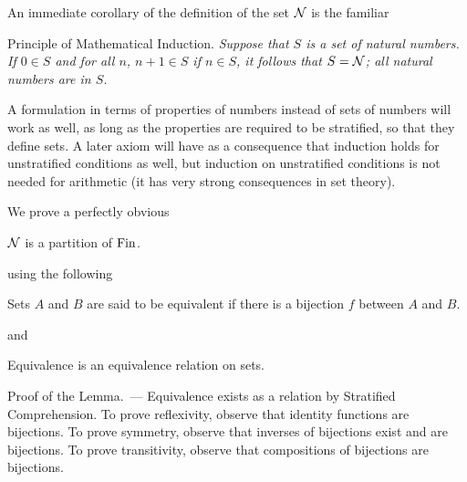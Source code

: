 An immediate corollary of the definition of the set ${\cal N}$ is the
familiar


\begin{ThmEtc}{Principle of Mathematical
Induction.}\slshape
{}
 Suppose that $S$ is a set
 of natural numbers.  If $0\in S$ and for all $n$, $n+1 \in S$ if $n
 \in S$, it follows that $S={\cal N}$; all natural numbers are in $S$.
\end{ThmEtc}

A formulation in terms of properties of numbers instead of
sets of numbers will work as well, as long as the properties are required to
be stratified, so that they define sets.  A later axiom
will have as a consequence that induction holds for unstratified conditions
as well, 
but induction on unstratified conditions is not needed
for arithmetic (it has very strong consequences in set theory).

We prove a perfectly obvious

\begin{thm}
 ${\cal N}$ is a partition of\/ $\mathrm{Fin}$.
\end{thm}
using the following
\begin{definition}
 Sets $A$ and $B$ are said to be {\upshape equivalent\/} if there
 is a bijection $f$ between $A$ and $B$.
\end{definition}
and
\begin{lemme}
 Equivalence is an equivalence relation on sets.
\end{lemme}

{\sc Proof of the Lemma.~---} Equivalence exists as a relation by Stratified
Comprehension.  To prove reflexivity,
observe that identity functions
are bijections.  To prove symmetry, observe that
inverses of bijections exist and are bijections.  To
prove transitivity, observe that compositions of bijections
are bijections.\finpreuve

